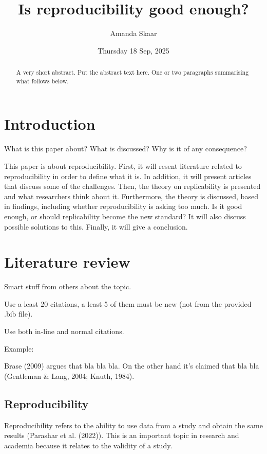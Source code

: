 \documentclass[
  a4paper,
]{article}
\title{Is reproducibility good enough?}
\author{Amanda Skaar}
\date{Thursday 18 Sep, 2025}
\begin{document}
\maketitle
\begin{abstract}
A very short abstract. Put the abstract text here. One or two paragraphs
summarising what follows below.
\end{abstract}


\section{Introduction}\label{introduction}

What is this paper about? What is discussed? Why is it of any
consequence?

This paper is about reproducibility. First, it will resent literature
related to reproducibility in order to define what it is. In addition,
it will present articles that discuss some of the challenges. Then, the
theory on replicability is presented and what researchers think about
it. Furthermore, the theory is discussed, based in findings, including
whether reproducibility is asking too much. Is it good enough, or should
replicability become the new standard? It will also discuss possible
solutions to this. Finally, it will give a conclusion.

\section{Literature review}\label{literature-review}

Smart stuff from others about the topic.

Use a least 20 citations, a least 5 of them must be new (not from the
provided .bib file).

Use both in-line and normal citations.

Example:

Brase (2009) argues that bla bla bla. On the other hand it's claimed
that bla bla (Gentleman \& Lang, 2004; Knuth, 1984).

\subsection{Reproducibility}\label{reproducibility}

Reproducibility refers to the ability to use data from a study and
obtain the same results (Parashar et al. (2022)). This is an important
topic in research and academia because it relates to the validity of a
study.
\end{document}
